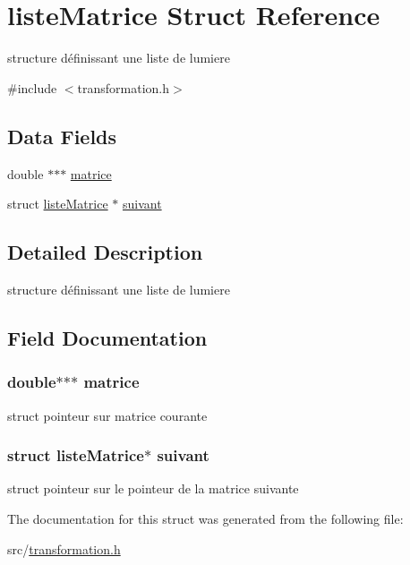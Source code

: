 \hypertarget{structliste_matrice}{
\section{listeMatrice Struct Reference}
\label{structliste_matrice}
}


structure définissant une liste de lumiere  




{\ttfamily \#include $<$transformation.h$>$}

\subsection*{Data Fields}
\begin{DoxyCompactItemize}
\item 
double $\ast$$\ast$$\ast$ \hyperlink{structliste_matrice_aff6ebdeeaa3de6a21c9ed1c299df9f73}{matrice}
\item 
struct \hyperlink{structliste_matrice}{listeMatrice} $\ast$ \hyperlink{structliste_matrice_a7e69fd01f1cae4d488b62d87377d2a41}{suivant}
\end{DoxyCompactItemize}


\subsection{Detailed Description}
structure définissant une liste de lumiere 

\subsection{Field Documentation}
\hypertarget{structliste_matrice_aff6ebdeeaa3de6a21c9ed1c299df9f73}{
\subsubsection[{matrice}]{\setlength{\rightskip}{0pt plus 5cm}double$\ast$$\ast$$\ast$ {\bf matrice}}}
\label{structliste_matrice_aff6ebdeeaa3de6a21c9ed1c299df9f73}
struct pointeur sur matrice courante \hypertarget{structliste_matrice_a7e69fd01f1cae4d488b62d87377d2a41}{
\subsubsection[{suivant}]{\setlength{\rightskip}{0pt plus 5cm}struct {\bf listeMatrice}$\ast$ {\bf suivant}}}
\label{structliste_matrice_a7e69fd01f1cae4d488b62d87377d2a41}
struct pointeur sur le pointeur de la matrice suivante 

The documentation for this struct was generated from the following file:\begin{DoxyCompactItemize}
\item 
src/\hyperlink{transformation_8h}{transformation.h}\end{DoxyCompactItemize}
